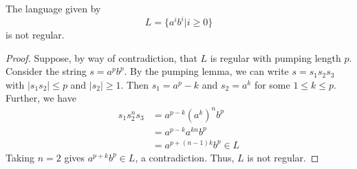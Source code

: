 \begin{theorem}
      The language given by \[ L=\{a^ib^i|i\geq0\} \] is not regular.
\end{theorem}

\begin{proof}
      Suppose, by way of contradiction, that \(L\) is regular with pumping length \(p\). Consider the string \(s=a^pb^p\). By the pumping lemma, we can write \(s=s_1s_2s_3\) with \(|s_1s_2|\leq p\) and \(|s_2|\geq 1\). Then \(s_1=a^p-k\) and \(s_2=a^k\) for some \(1\leq k\leq p\). Further, we have 
      \begin{align*}
            s_1s_2^n s_3 &= a^{p-k}{(a^k)}^n b^p\\
                         &= a^{p-k}a^{kn}b^p\\
                         &= a^{p+(n-1)k}b^p \in L
      \end{align*}
      Taking \(n=2\) gives \(a^{p+k}b^p\in L\), a contradiction. Thus, \(L\) is not regular.
\end{proof}